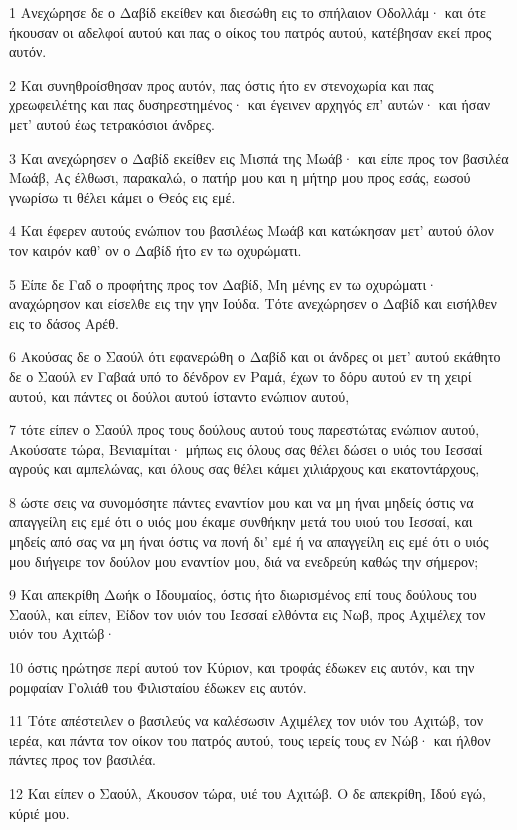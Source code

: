 \par 1 Ανεχώρησε δε ο Δαβίδ εκείθεν και διεσώθη εις το σπήλαιον Οδολλάμ· και ότε ήκουσαν οι αδελφοί αυτού και πας ο οίκος του πατρός αυτού, κατέβησαν εκεί προς αυτόν.
\par 2 Και συνηθροίσθησαν προς αυτόν, πας όστις ήτο εν στενοχωρία και πας χρεωφειλέτης και πας δυσηρεστημένος· και έγεινεν αρχηγός επ' αυτών· και ήσαν μετ' αυτού έως τετρακόσιοι άνδρες.
\par 3 Και ανεχώρησεν ο Δαβίδ εκείθεν εις Μισπά της Μωάβ· και είπε προς τον βασιλέα Μωάβ, Ας έλθωσι, παρακαλώ, ο πατήρ μου και η μήτηρ μου προς εσάς, εωσού γνωρίσω τι θέλει κάμει ο Θεός εις εμέ.
\par 4 Και έφερεν αυτούς ενώπιον του βασιλέως Μωάβ και κατώκησαν μετ' αυτού όλον τον καιρόν καθ' ον ο Δαβίδ ήτο εν τω οχυρώματι.
\par 5 Είπε δε Γαδ ο προφήτης προς τον Δαβίδ, Μη μένης εν τω οχυρώματι· αναχώρησον και είσελθε εις την γην Ιούδα. Τότε ανεχώρησεν ο Δαβίδ και εισήλθεν εις το δάσος Αρέθ.
\par 6 Ακούσας δε ο Σαούλ ότι εφανερώθη ο Δαβίδ και οι άνδρες οι μετ' αυτού εκάθητο δε ο Σαούλ εν Γαβαά υπό το δένδρον εν Ραμά, έχων το δόρυ αυτού εν τη χειρί αυτού, και πάντες οι δούλοι αυτού ίσταντο ενώπιον αυτού,
\par 7 τότε είπεν ο Σαούλ προς τους δούλους αυτού τους παρεστώτας ενώπιον αυτού, Ακούσατε τώρα, Βενιαμίται· μήπως εις όλους σας θέλει δώσει ο υιός του Ιεσσαί αγρούς και αμπελώνας, και όλους σας θέλει κάμει χιλιάρχους και εκατοντάρχους,
\par 8 ώστε σεις να συνομόσητε πάντες εναντίον μου και να μη ήναι μηδείς όστις να απαγγείλη εις εμέ ότι ο υιός μου έκαμε συνθήκην μετά του υιού του Ιεσσαί, και μηδείς από σας να μη ήναι όστις να πονή δι' εμέ ή να απαγγείλη εις εμέ ότι ο υιός μου διήγειρε τον δούλον μου εναντίον μου, διά να ενεδρεύη καθώς την σήμερον;
\par 9 Και απεκρίθη Δωήκ ο Ιδουμαίος, όστις ήτο διωρισμένος επί τους δούλους του Σαούλ, και είπεν, Είδον τον υιόν του Ιεσσαί ελθόντα εις Νωβ, προς Αχιμέλεχ τον υιόν του Αχιτώβ·
\par 10 όστις ηρώτησε περί αυτού τον Κύριον, και τροφάς έδωκεν εις αυτόν, και την ρομφαίαν Γολιάθ του Φιλισταίου έδωκεν εις αυτόν.
\par 11 Τότε απέστειλεν ο βασιλεύς να καλέσωσιν Αχιμέλεχ τον υιόν του Αχιτώβ, τον ιερέα, και πάντα τον οίκον του πατρός αυτού, τους ιερείς τους εν Νώβ· και ήλθον πάντες προς τον βασιλέα.
\par 12 Και είπεν ο Σαούλ, Άκουσον τώρα, υιέ του Αχιτώβ. Ο δε απεκρίθη, Ιδού εγώ, κύριέ μου.
